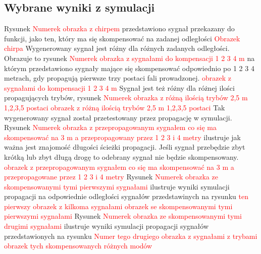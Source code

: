 \subsection{Wybrane wyniki z symulacji}
Rysunek \textcolor{red}{Numerek obrazka z chirpem} przedstawiono sygnał przekazany do funkcji, jako ten, który ma się skompensować na zadanej odległości
\textcolor{red}{Obrazek chirpa}
Wygenerowany sygnał jest różny dla różnych zadanych odległości. Obrazuje to rysunek \textcolor{red}{Numerek obrazka z sygnałami do kompensacji 1 2 3 4 m} na którym przedstawiono sygnały mające się skompensować odpowiednio po 1 2 3 4 metrach, gdy propagują pierwsze trzy postaci fali prowadzonej. 
\textcolor{red}{obrazek z sygnałami do kompensacji 1 2 3 4 m}
Sygnał jest też różny dla różnej ilości propagujących trybów, rysunek \textcolor{red}{Numerek obrazka z różną ilością trybów 2,5 m 1,2,3,5 postaci}
\textcolor{red}{obrazek z różną ilością trybów 2,5 m 1,2,3,5 postaci}
Tak wygenerowany sygnał został przetestowany przez propagację w symulacji. Rysunek \textcolor{red}{Numerek obrazka z przepropagowanym sygnałem co się ma skompensować na 3 m a przepropagowany przez 1 2 3 i 4 metry} ilustruje jak ważna jest znajomość długości ścieżki propagacji. Jeśli sygnał przebędzie zbyt krótką lub zbyt długą drogę to odebrany sygnał nie będzie skompensowany.
\textcolor{red}{obrazek z przepropagowanym sygnałem co się ma skompensować na 3 m a przepropagowane przez 1 2 3 i 4 metry}
Rysunek \textcolor{red}{Numerek obrazka ze skompensowanymi tymi pierwszymi sygnałami} ilustruje wyniki symulacji propagacji na odpowiednie odległości sygnałów przedstawinych na rysunku \textcolor{red}{ten pierwszy obrazek z kilkoma sygnałami}
\textcolor{red}{obrazek se skompensowanymi tymi pierwszymi sygnałami}
Rysunek \textcolor{red}{Numerek obrazka ze skompensowanymi tymi drugimi sygnałami} ilustruje wyniki  symulacji propagacji sygnałów przedstawionych na rysunku \textcolor{red}{Numer tego drugiego obrazka z sygnałami z trybami}
\textcolor{red}{obrazek tych skompensowanych różnych modów}  